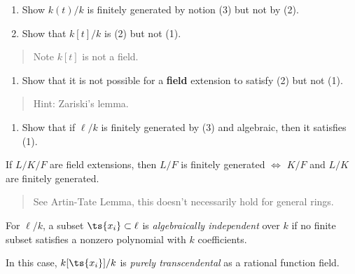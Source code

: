 \begin{exercise}

\hfill

\begin{enumerate}
\def\labelenumi{\alph{enumi}.}
\item
  Show \(k(t) / k\) is finitely generated by notion (3) but not by (2).
\item
  Show that \(k[t]/k\) is (2) but not (1).
\end{enumerate}

\begin{quote}
Note \(k[t]\) is not a field.
\end{quote}

\begin{enumerate}
\def\labelenumi{\alph{enumi}.}
\setcounter{enumi}{2}
\tightlist
\item
  Show that it is not possible for a \textbf{field} extension to satisfy
  (2) but not (1).
\end{enumerate}

\begin{quote}
Hint: Zariski's lemma.
\end{quote}

\begin{enumerate}
\def\labelenumi{\alph{enumi}.}
\setcounter{enumi}{3}
\tightlist
\item
  Show that if \(\ell/k\) is finitely generated by (3) and algebraic,
  then it satisfies (1).
\end{enumerate}

\end{exercise}

\begin{theorem}

If \(L/K/F\) are field extensions, then \(L/F\) is finitely generated
\(\iff\) \(K/F\) and \(L/K\) are finitely generated.

\end{theorem}

\begin{quote}
See Artin-Tate Lemma, this doesn't necessarily hold for general rings.
\end{quote}

\begin{definition}

For \(\ell/k\), a subset \(\ts{x_i}\subset \ell\) is \emph{algebraically
independent} over \(k\) if no finite subset satisfies a nonzero
polynomial with \(k\) coefficients.

In this case, \(k[\ts{x_i}] / k\) is \emph{purely transcendental} as a
rational function field.

\end{definition}

